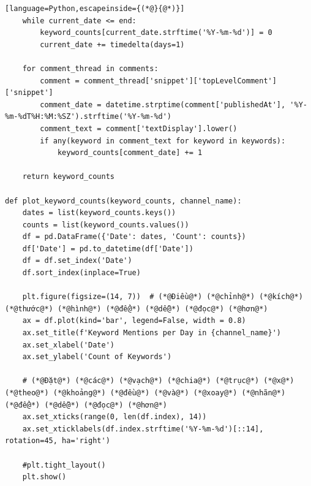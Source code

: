 \begin{lstlisting}[language=Python,escapeinside={(*@}{@*)}]
    while current_date <= end:
        keyword_counts[current_date.strftime('%Y-%m-%d')] = 0
        current_date += timedelta(days=1)

    for comment_thread in comments:
        comment = comment_thread['snippet']['topLevelComment']['snippet']
        comment_date = datetime.strptime(comment['publishedAt'], '%Y-%m-%dT%H:%M:%SZ').strftime('%Y-%m-%d')
        comment_text = comment['textDisplay'].lower()
        if any(keyword in comment_text for keyword in keywords):
            keyword_counts[comment_date] += 1

    return keyword_counts

def plot_keyword_counts(keyword_counts, channel_name):
    dates = list(keyword_counts.keys())
    counts = list(keyword_counts.values())
    df = pd.DataFrame({'Date': dates, 'Count': counts})
    df['Date'] = pd.to_datetime(df['Date'])
    df = df.set_index('Date')
    df.sort_index(inplace=True)

    plt.figure(figsize=(14, 7))  # (*@Điều@*) (*@chỉnh@*) (*@kích@*) (*@thước@*) (*@hình@*) (*@để@*) (*@dễ@*) (*@đọc@*) (*@hơn@*)
    ax = df.plot(kind='bar', legend=False, width = 0.8)
    ax.set_title(f'Keyword Mentions per Day in {channel_name}')
    ax.set_xlabel('Date')
    ax.set_ylabel('Count of Keywords')

    # (*@Đặt@*) (*@các@*) (*@vạch@*) (*@chia@*) (*@trục@*) (*@x@*) (*@theo@*) (*@khoảng@*) (*@đều@*) (*@và@*) (*@xoay@*) (*@nhãn@*) (*@để@*) (*@dễ@*) (*@đọc@*) (*@hơn@*)
    ax.set_xticks(range(0, len(df.index), 14))
    ax.set_xticklabels(df.index.strftime('%Y-%m-%d')[::14], rotation=45, ha='right')

    #plt.tight_layout()
    plt.show()
\end{lstlisting}

